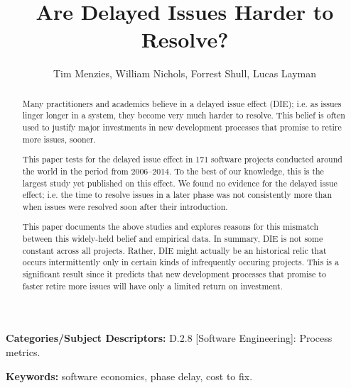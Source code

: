 \documentclass[smallcondesed]{svjour3}
\begin{document}
\date{}
 \title{Are Delayed Issues Harder to Resolve?}
 
 \author{Tim Menzies, William Nichols, Forrest Shull, Lucas Layman}
 
\maketitle
\begin{abstract}
Many  practitioners and academics
believe in a delayed issue effect (DIE); i.e.
 as issues linger longer in a system,
 they become very much harder to resolve.
This belief
is often  used to justify 
major investments in  new development
processes that promise to retire more issues, sooner.

This paper tests for the delayed issue effect in
171 software projects conducted around the world in the period from 2006--2014.
To the best of our knowledge,  this is the largest study
yet published on this effect.
We found no evidence for the  delayed issue effect; i.e.
the  time  to resolve 
issues in a later phase was  not consistently  more than  
when  issues were resolved soon after their introduction. 

This paper documents the above studies and explores reasons for this  mismatch between this widely-held
belief and empirical data.
In  summary, DIE is not some constant across all projects. Rather, DIE might
actually be an historical relic that  occurs intermittently 
only in  certain kinds of infrequently occuring projects.  This is a significant result since it predicts that  new development
processes that promise to faster retire more issues will have only a  limited return on investment. 
\end{abstract}

 \vspace{1mm}
\noindent
{\bf Categories/Subject Descriptors:} 
D.2.8 [Software Engineering]: Process metrics.

 

\vspace{1mm}
\noindent
{\bf Keywords:} software economics, phase delay, cost to fix.
 
\end{document}
